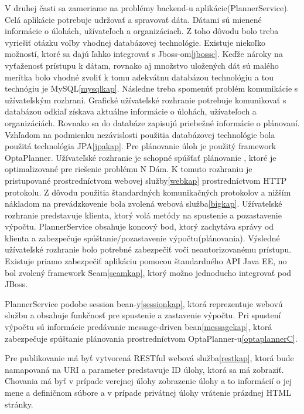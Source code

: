 V druhej časti sa zameriame na problémy backend-u aplikácie(PlannerService). Celá aplikácie potrebuje udržovať a spravovať dáta. Dátami sú mienené informácie o úlohách, užívateľoch a organizáciach. Z toho dôvodu bolo treba vyriešiť otázku voľby vhodnej databázovej technológie. Existuje niekoľko možností, ktoré sa dajú ľahko integrovať s Jboss-om\ref{jbossc}. Keďže nároky na vyťaženosť prístupu k dátam, rovnako aj množstvo uložených dát sú malého merítka bolo vhodné zvoliť k tomu adekvátnu databázou technológiu a tou technógiu je MySQL\ref{mysqlkap}. Následne treba spomenúť problém komunikácie s užívateľským rozhraní. Grafické užívateľské rozhranie potrebuje komunikovať s databázou odkiaľ získava aktuálne informácie o úlohách, užívateľoch a organizáciách. Rovnako sa do databáze zapisujú priebežné informácie o plánovaní. Vzhľadom na podmienku nezávislosti použitia databázovej technológie bola použitá technológia JPA\ref{jpakap}. Pre plánovanie úloh je použitý framework OptaPlanner. Užívateľské rozhranie je schopné spúšťať plánovanie , ktoré je optimalizované pre riešenie problému N Dám. K tomuto rozhraniu je pristupované prostredníctvom webovej služby\ref{webkap} prostredníctvom HTTP protokolu. Z dôvodu použitia štandardných komunikačných protokolov a nižším nákladom na prevádzkovenie bola zvolená  webová služba\ref{bigkap}. Užívateľské rozhranie predstavuje klienta, ktorý volá metódy na spustenie a pozastavenie výpočtu. PlannerService obsahuje koncový bod, ktorý zachytáva správy od klienta a zabezpečuje spúštanie/pozastavenie výpočtu(plánovania). Výsledné užívateľské rozhranie bolo potrebné zabezpečiť voči neautorizovanému prístupu. Existuje priamo zabezpečiť aplikáciu pomocou štandardného API Java EE, no bol zvolený framework Seam\ref{seamkap}, ktorý možno jednoducho integrovať pod JBoss.

PlannerService podobe session bean-y\ref{sessionkap}, ktorá reprezentuje webovú službu a obsahuje funkčnosť pre spustenie a zastavenie výpočtu. Pri spustení výpočtu sú informácie predávanie message-driven bean\ref{messagekap}, ktorá zabezpečuje spúštanie plánovania prostredníctvom OptaPlanner-u\ref{optaplannerC}.

Pre publikovanie má byť vytvorená RESTful webová služba\ref{restkap}, ktorá bude namapovaná na URI  a parameter predstavuje ID úlohy, ktorá sa má zobraziť. Chovania má byť v prípade verejnej úlohy zobrazenie úlohy a to informácií o jej mene a definičnom súbore a v prípade privátnej úlohy vrátenie prázdnej HTML stránky.

